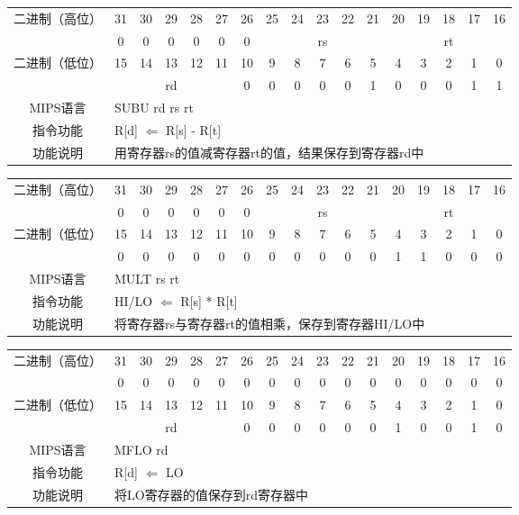 \begin{table}
\begin{tabular}{|c|c|c|c|c|c|c|c|c|c|c|c|c|c|c|c|c|}
\hline
\multirow{2}{*}{二进制（高位）} &
31&30&29&28&27&26&25&24&23&22&21&20&19&18&17&16\\
\cline{2-17}
&0&0&0&0&0&0&
\multicolumn{5}{c|}{rs}&
\multicolumn{5}{c|}{rt}\\
\hline
\multirow{2}{*}{二进制（低位）} &
15&14&13&12&11&10&9&8&7&6&5&4&3&2&1&0\\
\cline{2-17}
&
\multicolumn{5}{c|}{rd}&
0&0&0&0&0&1&0&0&0&1&1\\
\hline
MIPS语言&
\multicolumn{16}{l|}{SUBU rd rs rt}\\
\hline
指令功能&
\multicolumn{16}{l|}{R[d] $\Leftarrow$ R[s] - R[t]}\\
\hline
功能说明&
\multicolumn{16}{l|}{用寄存器rs的值减寄存器rt的值，结果保存到寄存器rd中}\\
\hline
\end{tabular}
\end{table}

\begin{table}

\clearpage
\begin{tabular}{|c|c|c|c|c|c|c|c|c|c|c|c|c|c|c|c|c|}
\hline
\multirow{2}{*}{二进制（高位）} &
31&30&29&28&27&26&25&24&23&22&21&20&19&18&17&16\\
\cline{2-17}
&0&0&0&0&0&0&
\multicolumn{5}{c|}{rs}&
\multicolumn{5}{c|}{rt}\\
\hline
\multirow{2}{*}{二进制（低位）} &
15&14&13&12&11&10&9&8&7&6&5&4&3&2&1&0\\
\cline{2-17}
&
0&0&0&0&0&0&0&0&0&0&0&1&1&0&0&0\\
\hline
MIPS语言&
\multicolumn{16}{l|}{MULT rs rt}\\
\hline
指令功能&
\multicolumn{16}{l|}{HI/LO $\Leftarrow$ R[s] * R[t]}\\
\hline
功能说明&
\multicolumn{16}{l|}{将寄存器rs与寄存器rt的值相乘，保存到寄存器HI/LO中}\\
\hline
\end{tabular}
\end{table}

\clearpage

\begin{table}
\begin{tabular}{|c|c|c|c|c|c|c|c|c|c|c|c|c|c|c|c|c|}
\hline
\multirow{2}{*}{二进制（高位）} &
31&30&29&28&27&26&25&24&23&22&21&20&19&18&17&16\\
\cline{2-17}
&0&0&0&0&0&0&0&0&0&0&0&0&0&0&0&0\\
\hline
\multirow{2}{*}{二进制（低位）} &
15&14&13&12&11&10&9&8&7&6&5&4&3&2&1&0\\
\cline{2-17}
&
\multicolumn{5}{c|}{rd}&
0&0&0&0&0&
0&1&0&0&1&
0\\
\hline
MIPS语言&
\multicolumn{16}{l|}{MFLO rd}\\
\hline
指令功能&
\multicolumn{16}{l|}{R[d] $\Leftarrow$ LO}\\
\hline
功能说明&
\multicolumn{16}{l|}{将LO寄存器的值保存到rd寄存器中}\\
\hline
\end{tabular}
\end{table}

